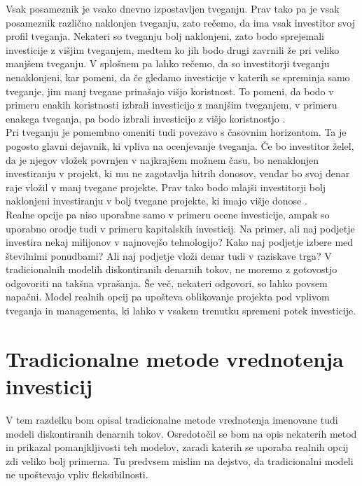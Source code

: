\documentclass[12pt, a4paper]{amsart}
\theoremstyle{definition} %
\theoremstyle{plain} %
\begin{document}
Vsak posameznik je vsako dnevno izpostavljen tveganju. Prav tako pa je vsak posameznik različno naklonjen tveganju, zato rečemo, da ima vsak investitor svoj profil tveganja. Nekateri so tveganju bolj naklonjeni, zato bodo sprejemali investicije z višjim tveganjem, medtem ko jih bodo drugi zavrnili že pri veliko manjšem tveganju. V splošnem pa lahko rečemo, da so investitorji tveganju nenaklonjeni, kar pomeni, da če gledamo investicije v katerih se spreminja samo tveganje, jim manj tvegane prinašajo višjo koristnost. To pomeni, da bodo v primeru enakih koristnosti izbrali investicijo z manjšim tveganjem, v primeru enakega tveganja, pa bodo izbrali investicijo z višjo koristnostjo \cite{Crnigoj}. \\

Pri tveganju je pomembno omeniti tudi povezavo s časovnim horizontom. Ta je pogosto glavni dejavnik, ki vpliva na ocenjevanje tveganja. Če bo investitor želel, da je njegov vložek povrnjen v najkrajšem možnem času, bo nenaklonjen investiranju v projekt, ki mu ne zagotavlja hitrih donosov, vendar bo svoj denar raje vložil v manj tvegane projekte. Prav tako bodo mlajši investitorji bolj naklonjeni investiranju v bolj tvegane projekte, ki imajo višje donose \cite{investopedia}. \\

Realne opcije pa niso uporabne samo v primeru ocene investicije, ampak so uporabno orodje tudi v primeru kapitalskih investicij. Na primer, ali naj podjetje investira nekaj milijonov v najnovejšo tehnologijo? Kako naj podjetje izbere med številnimi ponudbami? Ali naj podjetje vloži denar tudi v raziskave trga? V tradicionalnih modelih diskontiranih denarnih tokov, ne moremo z gotovostjo odgovoriti na takšna vprašanja. Še več, nekateri odgovori, so lahko povsem napačni.  Model realnih opcij pa upošteva oblikovanje projekta pod vplivom tveganja in managementa, ki lahko v vsakem trenutku spremeni potek investicije. \\


\section{Tradicionalne metode vrednotenja investicij}
V tem razdelku bom opisal tradicionalne metode vrednotenja imenovane tudi modeli diskontiranih denarnih tokov. Osredotočil se bom na opis nekaterih metod in prikazal pomanjkljivosti teh modelov, zaradi katerih se uporaba realnih opcij zdi veliko bolj primerna. Tu predvsem mislim na dejstvo, da tradicionalni modeli ne upoštevajo vpliv fleksibilnosti.
\end{document}
